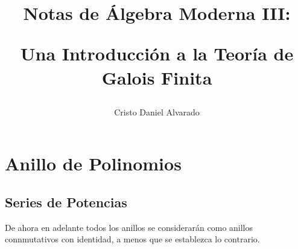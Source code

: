 \documentclass[12pt]{report}
\theoremstyle{largebreak}
\begin{document}
    \setlength{\parskip}{5pt} %
    \setlength{\parindent}{12pt} %
    \title{Notas de Álgebra Moderna III:
    
    Una Introducción a la Teoría de Galois Finita}
    \author{Cristo Daniel Alvarado}
    \maketitle

    \tableofcontents %


    \newpage

    \chapter{Anillo de Polinomios}

    \section{Series de Potencias}

    \begin{obs}
        De ahora en adelante todos los anillos se considerarán como anillos connmutativos con identidad, a menos que se establezca lo contrario.
    \end{obs}
\end{document}

